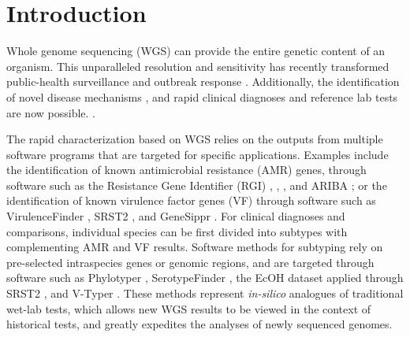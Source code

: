 \documentclass{article}
\begin{document}
\section{Introduction}

Whole genome sequencing (WGS) can provide the entire genetic content of an organism. This unparalleled resolution and sensitivity has recently transformed public-health surveillance and outbreak response \cite{ronholm2016navigating,lytsy2017time}. Additionally, the identification of novel disease mechanisms \cite{wang2014whole,yuen2015whole}, and rapid clinical diagnoses and reference lab tests are now possible. \cite{willig2015whole,dewey2014clinical}.

The rapid characterization based on WGS relies on the outputs from multiple software programs that are targeted for specific applications. Examples include the identification of known antimicrobial resistance (AMR) genes, through software such as the Resistance Gene Identifier (RGI) \cite{mcarthur2013comprehensive}, \cite{kleinheinz2014applying}, \cite{gupta2014arg}, and ARIBA \cite{hunt2017ariba}; or the identification of known virulence factor genes (VF) through software such as VirulenceFinder \cite{kleinheinz2014applying}, SRST2 \cite{inouye2014srst2}, and GeneSippr \cite{lambert2015genesippr}. For clinical diagnoses and comparisons, individual species can be first divided into subtypes with complementing AMR and VF results. Software methods for subtyping rely on pre-selected intraspecies genes or genomic regions, and are targeted through software such as Phylotyper \cite{whiteside2017phylotyper}, SerotypeFinder \cite{joensen2015rapid}, the EcOH dataset applied through SRST2 \cite{ingle2016silico}, and V-Typer \cite{carrillo2016comparative}. These methods represent \textit{in-silico} analogues of traditional wet-lab tests, which allows new WGS results to be viewed in the context of historical tests, and greatly expedites the analyses of newly sequenced genomes.
\end{document}
